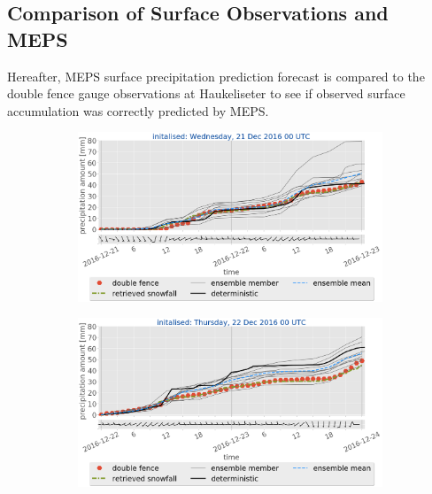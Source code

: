 \subsection{Comparison of Surface Observations and MEPS}\label{sec:sfc_acc}
Hereafter, MEPS surface precipitation prediction forecast is compared to the double fence gauge observations at Haukeliseter to see if observed surface accumulation was correctly predicted by MEPS.
\begin{figure}[H]
	\centering
	\begin{subfigure}[t]{0.99\textwidth}		\includegraphics[trim={0.cm 5.2cm 0.cm 0cm},clip,width=\textwidth]{./fig_sfc_acc/acc_wind_20161221_00}
		\caption{}\label{fig:sfc_acc21}
	\end{subfigure}
	\begin{subfigure}[t]{0.99\textwidth}		\includegraphics[trim={0.cm 5.2cm 0.cm 0cm},clip,width=\textwidth]{./fig_sfc_acc/acc_wind_20161222_00}
		\caption{}\label{fig:sfc_acc22}
	\end{subfigure}

\end{figure}
